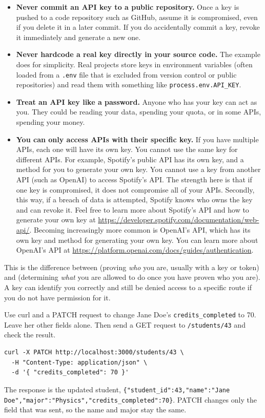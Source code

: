 \begin{itemize}
  \item \textbf{Never commit an API key to a public repository.} Once a
        key is pushed to a code repository such as GitHub, assume it is compromised, even if you
        delete it in a later commit. If you do accidentally commit a key, revoke it immediately and generate a new one.
  \item \textbf{Never hardcode a real key directly in your source code.} The example does for simplicity. Real projects store keys in environment variables (often loaded from a \texttt{.env}
        file that is excluded from version control or public repositories) and read them with
        something like \texttt{process.env.API\_KEY}.
  \item \textbf{Treat an API key like a password.} Anyone who has your
        key can act as you. They could be reading your data, spending your quota, or
        in some APIs, spending your money.
  \item \textbf{You can only access APIs with their specific key.} If you have multiple APIs, each one will have its own key. You cannot use the same key for different APIs. For example, Spotify's public API has its own key, and a method for you to generate your own key. You cannot use a key from another API (such as OpenAI) to access Spotify's API. The strength here is that if one key is compromised, it does not compromise all of your APIs. Secondly, this way, if a breach of data is attempted, Spotify knows who owns the key and can revoke it. Feel free to learn more about Spotify's API and how to generate your own key at \url{https://developer.spotify.com/documentation/web-api/}. Becoming increasingly more common is OpenAI's API, which has its own key and method for generating your own key. You can learn more about OpenAI's API at \url{https://platform.openai.com/docs/guides/authentication}.
\end{itemize}

This is the difference between  (proving
\emph{who} you are, usually with a key or token) and
 (determining \emph{what} you are allowed to do
once you have proven who you are). A key can identify you correctly and
still be denied access to a specific route if you do not have
permission for it.

\begin{Exercise}[title={Changing One Field with PATCH}, label=webapi1]
Use curl and a PATCH request to change Jane Doe's \texttt{credits\_completed} to 70. Leave her other fields alone. Then send a GET request to \texttt{/students/43} and check the result.
\end{Exercise}
\begin{Answer}[ref=webapi1]
\begin{verbatim}
curl -X PATCH http://localhost:3000/students/43 \
  -H "Content-Type: application/json" \
  -d '{ "credits_completed": 70 }'
\end{verbatim}
The response is the updated student, \texttt{\{"student\_id":43,"name":"Jane Doe","major":"Physics","credits\_completed":70\}}. PATCH changes only the field that was sent, so the name and major stay the same.
\end{Answer}

